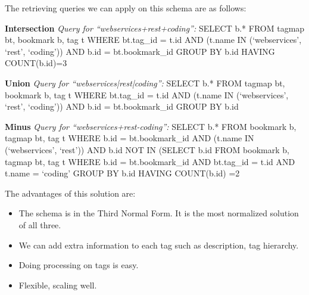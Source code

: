 The retrieving queries we can apply on this schema are as follows:

\textbf{Intersection}\newline
\textit{Query for ``webservices+rest+coding'':}\newline\newline
SELECT b.*\newline
FROM tagmap bt, bookmark b, tag t\newline
WHERE bt.tag\_id = t.id\newline
AND (t.name IN (`webservices', `rest', `coding'))\newline
AND b.id = bt.bookmark\_id\newline
GROUP BY b.id\newline
HAVING COUNT(b.id)=3

\textbf{Union}\newline
\textit{Query for ``webservices|rest|coding'':}\newline\newline
SELECT b.*\newline
FROM tagmap bt, bookmark b, tag t\newline
WHERE bt.tag\_id = t.id\newline
AND (t.name IN (`webservices', `rest', `coding'))\newline
AND b.id = bt.bookmark\_id\newline
GROUP BY b.id

\textbf{Minus}\newline
\textit{Query for ``webservices+rest-coding'':}\newline\newline
SELECT b.*\newline
FROM bookmark b, tagmap bt, tag t\newline
WHERE b.id = bt.bookmark\_id\newline
AND (t.name IN (`webservices', `rest'))\newline
AND b.id NOT IN (SELECT b.id FROM bookmark b, tagmap bt, tag t\newline
WHERE b.id = bt.bookmark\_id AND bt.tag\_id = t.id AND t.name = `coding'\newline
GROUP BY b.id\newline
HAVING COUNT(b.id) =2

The advantages of this solution are:
\begin{itemize}
   \item The schema is in the Third Normal Form. It is the most normalized solution of all three.
   \item We can add extra information to each tag such as description, tag hierarchy. 
   \item Doing processing on tags is easy.
   \item Flexible, scaling well.
\end{itemize}

